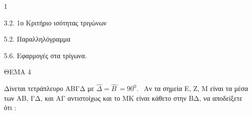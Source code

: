 \begin{ylh}{1}
    \item 3.2. 1ο Κριτήριο ισότητας τριγώνων
    \item 5.2. Παραλληλόγραμμα
    \item 5.6. Εφαρμογές στα τρίγωνα.
\end{ylh}

ΘΕΜΑ 4

Δίνεται τετράπλευρο ΑΒΓΔ με $\widehat{\Delta} = \widehat{Β\ } = 90^{0}.\ \ $ Αν τα σημεία Ε, Ζ, Μ είναι τα μέσα των ΑΒ, ΓΔ, και ΑΓ αντιστοίχως και το ΜΚ είναι κάθετο στην ΒΔ, να αποδείξετε ότι :

